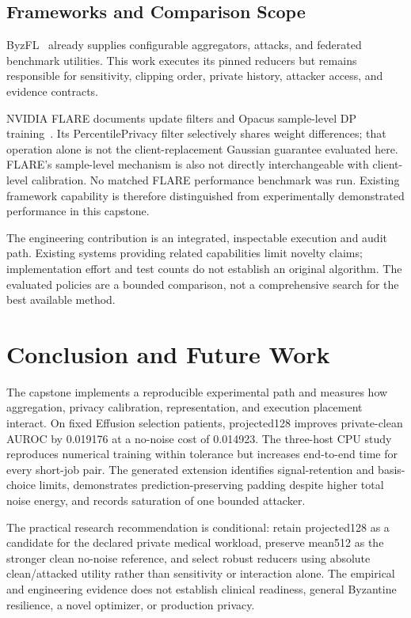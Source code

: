 \documentclass[conference,letterpaper]{IEEEtran}
\begin{document}
\subsection{Frameworks and Comparison Scope}
ByzFL~\cite{byzfl} already supplies configurable aggregators, attacks, and federated benchmark utilities. This work executes its pinned reducers but remains responsible for sensitivity, clipping order, private history, attacker access, and evidence contracts.

NVIDIA FLARE documents update filters and Opacus sample-level DP training~\cite{flare}. Its PercentilePrivacy filter selectively shares weight differences; that operation alone is not the client-replacement Gaussian guarantee evaluated here. FLARE's sample-level mechanism is also not directly interchangeable with client-level calibration. No matched FLARE performance benchmark was run. Existing framework capability is therefore distinguished from experimentally demonstrated performance in this capstone.

The engineering contribution is an integrated, inspectable execution and audit path. Existing systems providing related capabilities limit novelty claims; implementation effort and test counts do not establish an original algorithm. The evaluated policies are a bounded comparison, not a comprehensive search for the best available method.

\section{Conclusion and Future Work}
The capstone implements a reproducible experimental path and measures how aggregation, privacy calibration, representation, and execution placement interact. On fixed Effusion selection patients, projected128 improves private-clean AUROC by 0.019176 at a no-noise cost of 0.014923. The three-host CPU study reproduces numerical training within tolerance but increases end-to-end time for every short-job pair. The generated extension identifies signal-retention and basis-choice limits, demonstrates prediction-preserving padding despite higher total noise energy, and records saturation of one bounded attacker.

The practical research recommendation is conditional: retain projected128 as a candidate for the declared private medical workload, preserve mean512 as the stronger clean no-noise reference, and select robust reducers using absolute clean/attacked utility rather than sensitivity or interaction alone. The empirical and engineering evidence does not establish clinical readiness, general Byzantine resilience, a novel optimizer, or production privacy.
\end{document}
